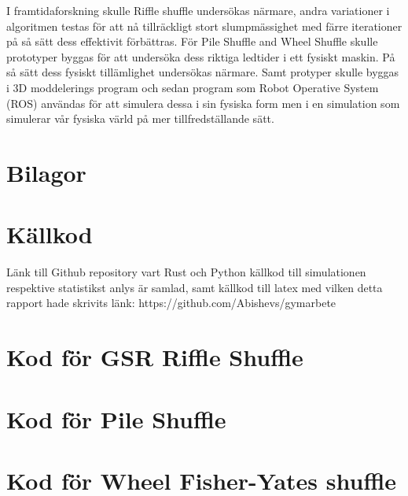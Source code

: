 \documentclass[swedish,a4paper]{article}
\renewcommand{\appendixpagename}{Bilagor}
\begin{document}
I framtidaforskning skulle Riffle shuffle undersökas närmare, andra variationer i
algoritmen testas för att nå tillräckligt stort slumpmässighet med färre
iterationer på så sätt dess effektivit förbättras. För Pile Shuffle and Wheel
Shuffle skulle prototyper byggas för att undersöka dess riktiga ledtider i ett
fysiskt maskin. På så sätt dess fysiskt tillämlighet undersökas närmare. Samt
protyper skulle byggas i 3D moddelerings program och sedan program som Robot
Operative System (ROS) användas för att simulera dessa i sin fysiska form men i
en simulation som simulerar vår fysiska värld på mer tillfredställande sätt.



\printbibliography[heading=bibintoc, title={Bibliografi}]

\appendix
\section*{\appendixpagename} 
\addcontentsline{toc}{section}{\appendixpagename} 

\section{Källkod}
\label{app:github}
Länk till Github repository vart Rust och Python källkod till simulationen 
respektive statistikst anlys är samlad, samt källkod till latex med
vilken detta rapport hade skrivits
länk: https://github.com/Abishevs/gymarbete

\section{Kod för GSR Riffle Shuffle}
\label{app:gsr}



\section{Kod för Pile Shuffle}
\label{app:pile}


\section{Kod för Wheel Fisher-Yates shuffle}
\label{app:wheel}

\end{document}
